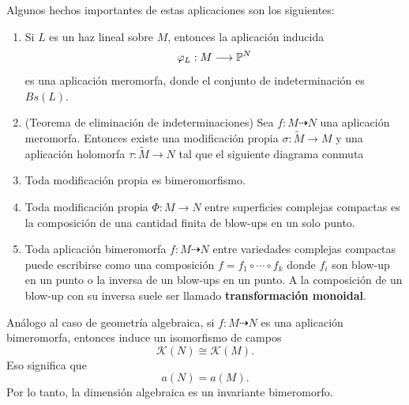 \begin{remark}\parencite[Chap VII, Sec. 1]{grauertremment}
	Algunos hechos importantes de estas aplicaciones son los siguientes:
	\begin{enumerate}
		\item Si $L$ es un haz lineal sobre $M$, entonces la aplicación inducida
		\begin{equation*}
			\varphi_L:M\longrightarrow\mathbb{P}^N
		\end{equation*}
		es una aplicación meromorfa, donde el conjunto de indeterminación es $Bs(L)$.
		\item (Teorema de eliminación de indeterminaciones) Sea $f:M\dashrightarrow N$ una aplicación meromorfa. Entonces existe una modificación propia $\sigma:\tilde{M}\to M$ y una aplicación holomorfa $\tau:\tilde{M}\to N$ tal que el siguiente diagrama conmuta
		\begin{center}
		\end{center}
		\item Toda modificación propia es bimeromorfismo.
		\item Toda modificación propia $\Phi:M\to N$ entre superficies complejas compactas es la composición de una cantidad finita de blow-ups en un solo punto.
		\item Toda aplicación bimeromorfa $f:M\dashrightarrow N$ entre variedades complejas compactas puede escribirse como una composición $f=f_1\circ\cdots\circ f_k$ donde $f_i$ son blow-up en un punto o la inversa de un blow-ups en un punto. A la composición de un blow-up con su inversa suele ser llamado \textbf{transformación monoidal}.
	\end{enumerate}
\end{remark}

Análogo al caso de geometría algebraica, si $f:M\dashrightarrow N$ es una aplicación bimeromorfa, entonces induce un isomorfismo de campos
\begin{equation*}
	\mathcal{K}(N)\cong \mathcal{K}(M).
\end{equation*}
Eso significa que
\begin{equation*}
	a(N)=a(M).
\end{equation*}
Por lo tanto, la dimensión algebraica es un invariante bimeromorfo. 

